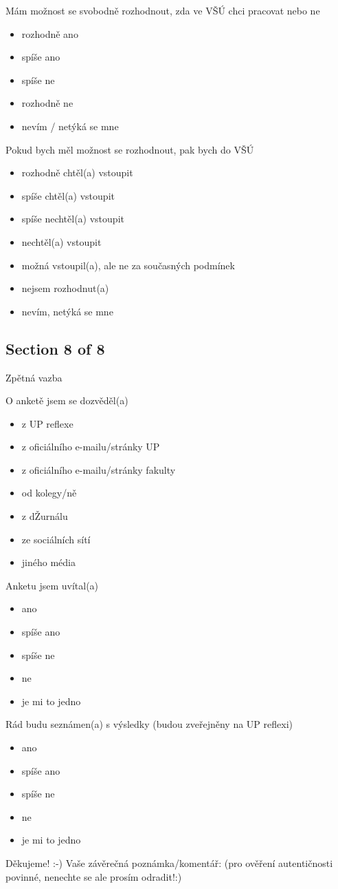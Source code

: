 Mám možnost se svobodně rozhodnout, zda ve VŠÚ chci pracovat nebo ne
\begin{itemize}
      \item rozhodně ano
      \item spíše ano
      \item spíše ne
      \item rozhodně ne
      \item nevím / netýká se mne
\end{itemize}

Pokud bych měl možnost se rozhodnout, pak bych do VŠÚ 
\begin{itemize}
      \item rozhodně chtěl(a) vstoupit
      \item spíše chtěl(a) vstoupit
      \item spíše nechtěl(a) vstoupit
      \item nechtěl(a) vstoupit
      \item možná vstoupil(a), ale ne za současných podmínek
      \item nejsem rozhodnut(a)
      \item nevím, netýká se mne
\end{itemize}

\subsection{Section 8 of 8}
Zpětná vazba

\bigskip
O anketě jsem se dozvěděl(a) 
\begin{itemize}
      \item z UP reflexe
      \item z oficiálního e-mailu/stránky UP
      \item z oficiálního e-mailu/stránky fakulty
      \item od kolegy/ně
      \item z dŽurnálu
      \item ze sociálních sítí
      \item jiného média
\end{itemize}

Anketu jsem uvítal(a)
\begin{itemize}
      \item ano
      \item spíše ano
      \item spíše ne
      \item ne
      \item je mi to jedno
\end{itemize}

Rád budu seznámen(a) s výsledky (budou zveřejněny na UP reflexi)
\begin{itemize}
      \item ano
      \item spíše ano
      \item spíše ne
      \item ne
      \item je mi to jedno
\end{itemize}

Děkujeme! :-) Vaše závěrečná poznámka/komentář: (pro ověření autentičnosti povinné, nenechte se ale prosím odradit!:) 


